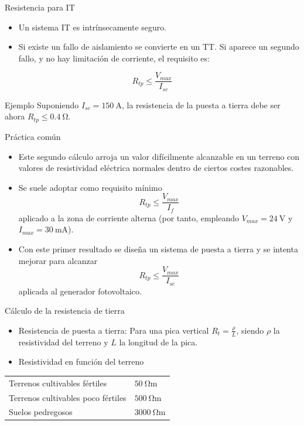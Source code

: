\documentclass[xcolor={usenames,svgnames,dvipsnames}]{beamer}
\begin{document}
\begin{frame}[label={sec:org7247a1c}]{Resistencia para IT}
\begin{itemize}
\item Un sistema IT es intrínsecamente seguro.
\item Si existe un fallo de aislamiento se convierte en un TT. Si aparece
un segundo fallo, y no hay limitación de corriente, el requisito es:
\end{itemize}
$$R_{tp}\leq\frac{V_{max}}{I_{sc}}$$

\begin{block}{Ejemplo}
Suponiendo \(I_{sc}=\SI{150}{\ampere}\), la resistencia de
la puesta a tierra debe ser ahora \(R_{tp}\leq\SI{0.4}{\ohm}\).
\end{block}
\end{frame}

\begin{frame}[label={sec:orgb5facc2}]{Práctica común}
\begin{itemize}
\item Este segundo cálculo arroja un \alert{valor difícilmente alcanzable} en un
terreno con valores de resistividad eléctrica normales \alert{dentro de
ciertos costes razonables}.

\item Se suele adoptar como requisito mínimo
$$R_{tp}\leq\frac{V_{max}}{I_{f}}$$ aplicado a la zona de corriente
alterna (por tanto, empleando \(V_{max}=\SI{24}{\volt}\) y
\(I_{max}=\SI{30}{\milli\ampere}\)).

\item Con este primer resultado se diseña un sistema de puesta a tierra y
se intenta mejorar para alcanzar
$$R_{tp}\leq\frac{V_{max}}{I_{sc}}$$ aplicada al generador
fotovoltaico.
\end{itemize}
\end{frame}

\begin{frame}[label={sec:org8e84fd2}]{Cálculo de la resistencia de tierra}
\begin{itemize}
\item \alert{Resistencia de puesta a tierra}: Para una pica vertical
\(R_{t}=\frac{\rho}{L}\), siendo \(\rho\) la resistividad del terreno y
\(L\) la longitud de la pica.

\item \alert{Resistividad en función del terreno}
\end{itemize}

\begin{center}
\begin{tabular}{ll}
Terrenos cultivables fértiles & \(\SI{50}{\ohm\meter}\)\\
Terrenos cultivables poco fértiles & \(\SI{500}{\ohm\meter}\)\\
Suelos pedregosos & \(\SI{3000}{\ohm\meter}\)\\
\end{tabular}
\end{center}
\end{frame}
\end{document}

